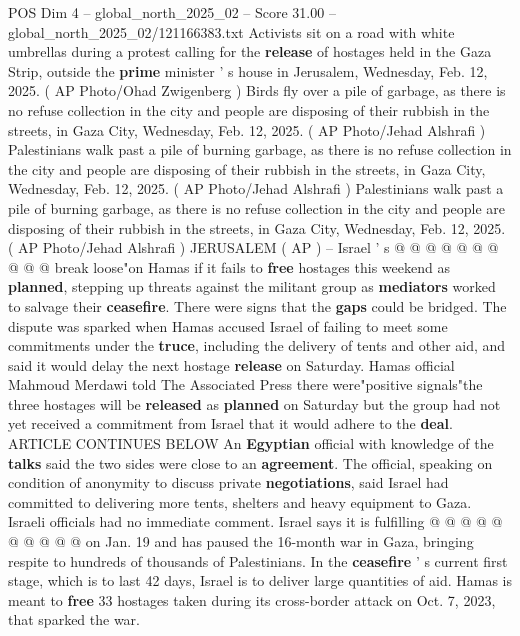 \begin{textsample}{POS Dim 4 – global\_north\_2025\_02 – Score 31.00 – global\_north\_2025\_02/121166383.txt}  \label{ex:f4_pos_060}
Activists sit on a road with white umbrellas during a protest calling for the \textbf{release} of hostages held in the Gaza Strip, outside the \textbf{prime} minister ' s house in Jerusalem, Wednesday, Feb. 12, 2025. ( AP Photo/Ohad Zwigenberg ) Birds fly over a pile of garbage, as there is no refuse collection in the city and people are disposing of their rubbish in the streets, in Gaza City, Wednesday, Feb. 12, 2025. ( AP Photo/Jehad Alshrafi ) Palestinians walk past a pile of burning garbage, as there is no refuse collection in the city and people are disposing of their rubbish in the streets, in Gaza City, Wednesday, Feb. 12, 2025. ( AP Photo/Jehad Alshrafi ) Palestinians walk past a pile of burning garbage, as there is no refuse collection in the city and people are disposing of their rubbish in the streets, in Gaza City, Wednesday, Feb. 12, 2025. ( AP Photo/Jehad Alshrafi ) JERUSALEM ( AP ) -- Israel ' s @ @ @ @ @ @ @ @ @ @ break loose"on Hamas if it fails to \textbf{free} hostages this weekend as \textbf{planned}, stepping up threats against the militant group as \textbf{mediators} worked to salvage their \textbf{ceasefire}.
There were signs that the \textbf{gaps} could be bridged.
The dispute was sparked when Hamas accused Israel of failing to meet some commitments under the \textbf{truce}, including the delivery of tents and other aid, and said it would delay the next hostage \textbf{release} on Saturday.
Hamas official Mahmoud Merdawi told The Associated Press there were"positive signals"the three hostages will be \textbf{released} as \textbf{planned} on Saturday but the group had not yet received a commitment from Israel that it would adhere to the \textbf{deal}.
ARTICLE CONTINUES BELOW An \textbf{Egyptian} official with knowledge of the \textbf{talks} said the two sides were close to an \textbf{agreement}.
The official, speaking on condition of anonymity to discuss private \textbf{negotiations}, said Israel had committed to delivering more tents, shelters and heavy equipment to Gaza.
Israeli officials had no immediate comment.
Israel says it is fulfilling @ @ @ @ @ @ @ @ @ @ on Jan. 19 and has paused the 16-month war in Gaza, bringing respite to hundreds of thousands of Palestinians.
In the \textbf{ceasefire} ' s current first stage, which is to last 42 days, Israel is to deliver large quantities of aid.
Hamas is meant to \textbf{free} 33 hostages taken during its cross-border attack on Oct. 7, 2023, that sparked the war.

\end{textsample}
